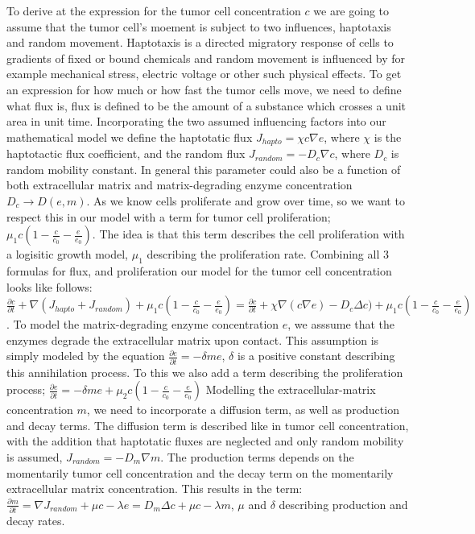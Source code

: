 To derive at the expression for the tumor cell concentration $c$ we are going to assume that the tumor cell's moement is subject to two influences, haptotaxis and random movement. Haptotaxis is a directed migratory response of cells to gradients of fixed or bound chemicals \cite{anderson_continuous_1998} and random movement is influenced by for example mechanical stress, electric voltage or other such physical effects. To get an expression for how much or how fast the tumor cells move, we need to define what flux is, flux is defined to be the amount of a substance  which crosses a unit area in unit time. Incorporating the two assumed influencing factors into our mathematical model we define the haptotatic flux $J_{hapto} = \chi c \nabla e$, where $\chi$ is the haptotactic flux coefficient, and the random flux $J_{random} = -D_c \nabla c$, where $D_c$ is random mobility constant. In general this parameter could also be a function of both extracellular matrix and matrix-degrading enzyme concentration $D_c \rightarrow D(e,m)$. As we know cells proliferate and grow over time, so we want to respect this in our model with a term for tumor cell proliferation; $\mu_1 c (1-\frac{c}{c_0} - \frac{e}{e_0})$. The idea is that this term describes the cell proliferation with a logisitic growth model, $\mu_1$ describing the proliferation rate.
Combining all 3 formulas for flux, and proliferation our model for the tumor cell concentration looks like follows: $\frac{\partial c}{\partial t} + \nabla (J_{hapto} + J_{random}) + \mu_1 c (1-\frac{c}{c_0} - \frac{e}{e_0}) = \frac{\partial c}{\partial t} + \chi \nabla (c \nabla e) - D_c \Delta c) + \mu_1 c (1-\frac{c}{c_0} - \frac{e}{e_0})$.\newline 
To model the matrix-degrading enzyme concentration $e$, we asssume that the enzymes degrade the extracellular matrix upon contact. This assumption is simply modeled by the equation $\frac{\partial e}{\partial t} = -\delta m e$, $\delta$ is a positive constant describing this annihilation process. To this we also add a term describing the proliferation process; $\frac{\partial e}{\partial t} = -\delta m e + \mu_2 c (1 - \frac{c}{c_0} - \frac{e}{e_0})$\newline 
Modelling the extracellular-matrix concentration $m$, we need to incorporate a diffusion term, as well as production and decay terms. The diffusion term is described like in tumor cell concentration, with the addition that haptotatic fluxes are neglected and only random mobility is assumed, $J_{random} = -D_m \nabla m$. The production terms depends on the momentarily tumor cell concentration and the decay term on the momentarily extracellular matrix concentration. This results in the term: $\frac{\partial m}{\partial t} = \nabla J_{random} + \mu c - \lambda e = D_m \Delta c + \mu c - \lambda m$, $\mu$ and $\delta$ describing production and decay rates.

